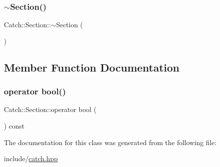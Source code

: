 \mbox{\label{class_catch_1_1_section_aa1422edd68a77aa578b5cc6b8b69f86f}} 
\subsubsection{\texorpdfstring{$\sim$\+Section()}{~Section()}}
{\footnotesize\ttfamily Catch\+::\+Section\+::$\sim$\+Section (\begin{DoxyParamCaption}{ }\end{DoxyParamCaption})}



\subsection{Member Function Documentation}
\mbox{\label{class_catch_1_1_section_a0632b804dcea1417a2970620a9742eb3}} 
\subsubsection{\texorpdfstring{operator bool()}{operator bool()}}
{\footnotesize\ttfamily Catch\+::\+Section\+::operator bool (\begin{DoxyParamCaption}{ }\end{DoxyParamCaption}) const}



The documentation for this class was generated from the following file\+:\begin{DoxyCompactItemize}
\item 
include/\mbox{\hyperlink{catch_8hpp}{catch.\+hpp}}\end{DoxyCompactItemize}
